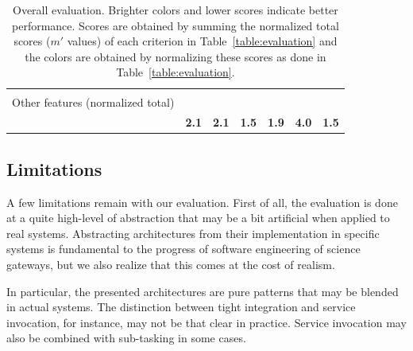 \documentclass[preprint,3p,twocolumn]{elsarticle}
\begin{document}
\begin{table}
\begin{tabular}{rcccccc}
                                     & \cellcolor[HTML]{99DD99}{0.50}
                                     & \cellcolor[HTML]{99FF99}{0.00}
                                     & \cellcolor[HTML]{99DD99}{0.50}
                                     & \cellcolor[HTML]{99DD99}{0.50}\\
Other features (normalized total) & \cellcolor[HTML]{99DD99}{0.50}
                                     & \cellcolor[HTML]{99DD99}{0.50}
                                     & \cellcolor[HTML]{99BB99}{1.00}
                                     & \cellcolor[HTML]{99DD99}{0.50}
                                     & \cellcolor[HTML]{99DD99}{0.50}
                                     & \cellcolor[HTML]{99FF99}{0.00}\\
                                    & \cellcolor[HTML]{99EE99}\textbf{2.1}
                                    & \cellcolor[HTML]{99EE99}\textbf{2.1}
                                    & \cellcolor[HTML]{99FF99}\textbf{1.5}
                                    & \cellcolor[HTML]{99F499}\textbf{1.9}
                                    & \cellcolor[HTML]{99BB99}\textbf{4.0}
                                    & \cellcolor[HTML]{99FF99}\textbf{1.5}\\
\end{tabular}
\caption{Overall evaluation. Brighter colors and lower scores indicate better performance. Scores
  are obtained by summing the normalized total scores ($m'$ values) of
  each criterion in Table~\ref{table:evaluation} and the colors are obtained by normalizing these scores
  as done in Table~\ref{table:evaluation}. }
\label{table:overall}
\end{table}

\subsection{Limitations}

A few limitations remain with our evaluation. First of all, the
evaluation is done at a quite high-level of abstraction that may be a
bit artificial when applied to real systems. Abstracting architectures
from their implementation in specific systems is fundamental to the
progress of software engineering of science gateways, but we also
realize that this comes at the cost of realism. 

In particular, the presented architectures are pure patterns that may
be blended in actual systems. The distinction between tight
integration and service invocation, for instance, may not be that
clear in practice. Service invocation may also be combined with
sub-tasking in some cases.
\end{document}

